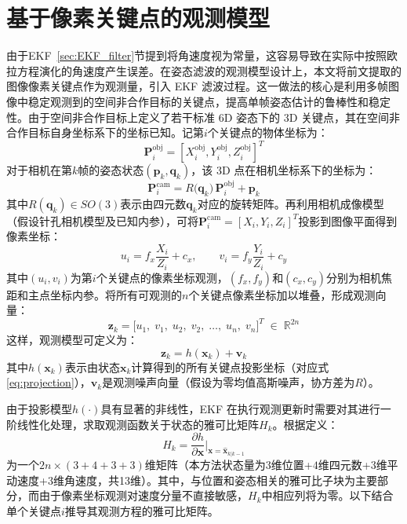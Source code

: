 \section{基于像素关键点的观测模型}

由于EKF~\ref{sec:EKF_filter}节提到将角速度视为常量，这容易导致在实际中按照欧拉方程演化的角速度产生误差。在姿态滤波的观测模型设计上，本文将前文提取的图像像素关键点作为观测量，引入 EKF 滤波过程。这一做法的核心是利用多帧图像中稳定观测到的空间非合作目标的关键点，提高单帧姿态估计的鲁棒性和稳定性。由于空间非合作目标上定义了若干标准 6D 姿态下的 3D 关键点，其在空间非合作目标自身坐标系下的坐标已知。记第$i$个关键点的物体坐标为：
\begin{equation}
	\mathbf{P}_i^{\mathrm{obj}}=[X_i^{\mathrm{obj}}, Y_i^{\mathrm{obj}}, Z_i^{\mathrm{obj}}]^T
\end{equation}
对于相机在第$k$帧的姿态状态$(\mathbf{p}_k,\mathbf{q}_k)$，该 3D 点在相机坐标系下的坐标为：
\begin{equation}
	\mathbf{P}_i^{\mathrm{cam}} = R\bigl(\mathbf{q}_k\bigr)\,\mathbf{P}_i^{\mathrm{obj}} + \mathbf{p}_k
\end{equation}
其中$R(\mathbf{q}_k)\in SO(3)$表示由四元数$\mathbf{q}_k$对应的旋转矩阵。再利用相机成像模型（假设针孔相机模型及已知内参），可将$\mathbf{P}_i^{\mathrm{cam}}=[X_i, Y_i, Z_i]^T$投影到图像平面得到像素坐标：
\begin{equation}
	\label{eq:projection}
	u_i = f_x \frac{X_i}{Z_i} + c_x,\qquad
	v_i = f_y \frac{Y_i}{Z_i} + c_y
\end{equation}
其中$(u_i,v_i)$为第$i$个关键点的像素坐标观测，$(f_x, f_y)$和$(c_x, c_y)$分别为相机焦距和主点坐标内参。将所有可观测的$n$个关键点像素坐标加以堆叠，形成观测向量：
\begin{equation}
	\mathbf{z}_k = \bigl[u_1,\;v_1,\;u_2,\;v_2,\;\dots,\;u_n,\;v_n\bigr]^T \;\in\; \mathbb{R}^{2n}
\end{equation}
这样，观测模型可定义为：
\begin{equation}
	\mathbf{z}_k = h(\mathbf{x}_k) + \mathbf{v}_k
\end{equation}
其中$h(\mathbf{x}_k)$表示由状态$\mathbf{x}_k$计算得到的所有关键点投影坐标（对应式\eqref{eq:projection}），$\mathbf{v}_k$是观测噪声向量（假设为零均值高斯噪声，协方差为$R$）。

由于投影模型$h(\cdot)$具有显著的非线性，EKF 在执行观测更新时需要对其进行一阶线性化处理，求取观测函数关于状态的雅可比矩阵$H_k$。根据定义：
\begin{equation}
	H_k = \frac{\partial h}{\partial \mathbf{x}}\bigl|_{\mathbf{x}=\hat{\mathbf{x}}_{k|k-1}}
\end{equation}
为一个$2n \times (3+4+3+3)$维矩阵（本方法状态量为$3$维位置+$4$维四元数+$3$维平动速度+$3$维角速度，共13维）。其中，与位置和姿态相关的雅可比子块为主要部分，而由于像素坐标观测对速度分量不直接敏感，$H_k$中相应列将为零。以下结合单个关键点$i$推导其观测方程的雅可比矩阵。

